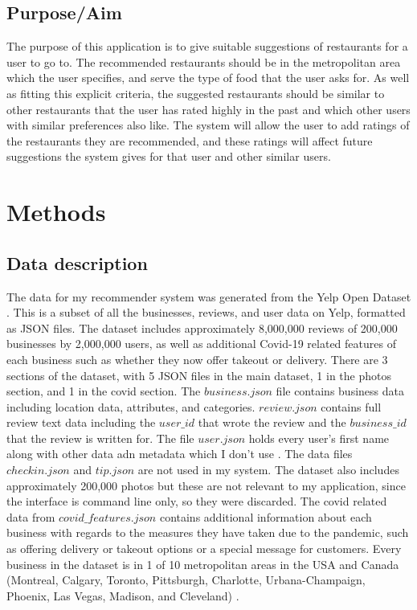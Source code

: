 \documentclass[conference]{IEEEtran}
\begin{document}
\subsection{Purpose/Aim}
The purpose of this application is to give suitable suggestions of restaurants for a user to go to. 
The recommended restaurants should be in the metropolitan area which the user specifies, and serve the 
type of food that the user asks for. 
As well as fitting this explicit criteria, the suggested restaurants should be similar to other restaurants 
that the user has rated highly in the past and which other users with similar preferences also like. 
The system will allow the user to add ratings of the restaurants they are recommended, and these ratings will 
affect future suggestions the system gives for that user and other similar users. 


\section{Methods}

\subsection{Data description}
The data for my recommender system was generated from the Yelp Open Dataset \cite{YelpDataset}. 
This is a subset of all the businesses, reviews, and user data on Yelp, formatted as JSON files. 
The dataset includes approximately 8,000,000 reviews of 200,000 businesses by 2,000,000 users, as well as 
additional Covid-19 related features of each business such as whether they now offer takeout or delivery. 
There are 3 sections of the dataset, with 5 JSON files in the main dataset, 1 in the photos section, and 
1 in the covid section. 
The $business.json$ file contains business data including location data, attributes, and categories. 
$review.json$ contains full review text data including the $user\_id$ that wrote the review and the $business\_id$ 
that the review is written for. 
The file $user.json$ holds every user's first name along with other data adn metadata which I don't use \cite{YelpDataset}. 
The data files $checkin.json$ and $tip.json$ are not used in my system. 
The dataset also includes approximately 200,000 photos but these are not relevant to my application, since 
the interface is command line only, so they were discarded. 
The covid related data from $covid\_features.json$ contains additional information about each business with regards to 
the measures they have taken due to the pandemic, such as offering delivery or takeout options or a 
special message for customers. 
Every business in the dataset is in 1 of 10 metropolitan areas in the USA and Canada 
(Montreal, Calgary, Toronto, Pittsburgh, Charlotte, Urbana-Champaign, Phoenix, Las Vegas, Madison, and Cleveland) \cite{YelpDataset}. 
\end{document}
